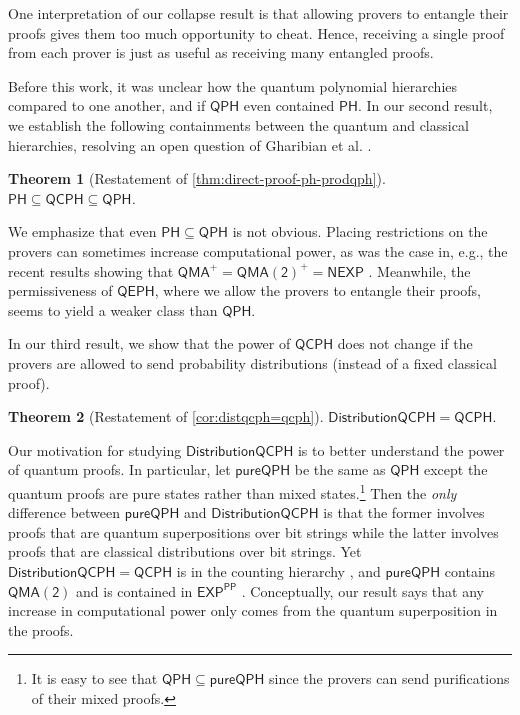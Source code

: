\documentclass[10pt,a4paper]{article}
\newtheorem{theorem}{Theorem}[section]
\theoremstyle{definition}
\newcommand{\class}[1]{\ensuremath{\mathsf{#1}}\xspace}
\newcommand{\EXP}{\class{EXP}}
\newcommand{\NEXP}{\class{NEXP}}
\newcommand{\QMA}{\class{QMA}}
\newcommand{\QMAk}[1][k]{\class{QMA(#1)}}
\newcommand{\QMAtwo}{\QMAk[2]}
\newcommand{\PP}{\class{PP}}
\newcommand{\PH}{\class{PH}}
\newcommand{\QCPH}{\class{QCPH}}
\newcommand{\QPH}{\class{QPH}}
\newcommand{\pureQPH}{\class{pureQPH}}
\newcommand{\QEPH}{\class{QEPH}}
\newcommand{\distributionQCPH}{\mathsf{DistributionQCPH}}
\begin{document}
One interpretation of our collapse result is that allowing provers to entangle their proofs gives them too much opportunity to cheat. Hence, receiving a single proof from each prover is just as useful as receiving many entangled proofs. 

Before this work, it was unclear how the quantum polynomial hierarchies compared to one another, and if $\QPH$ even contained $\PH$. 
In our second result, we establish the following containments between the quantum and classical hierarchies, resolving an open question of Gharibian et al. \cite{GSSSY22_qph}.

\begin{theorem}[Restatement of \cref{thm:direct-proof-ph-prodqph}]
    $\PH \subseteq \QCPH \subseteq \QPH$.
\end{theorem}

We emphasize that even $\PH \subseteq \QPH$ is not obvious.
Placing restrictions on the provers can sometimes increase computational power, as was the case in, e.g., the recent results showing that $\QMA^+ = \QMAtwo^+ = \NEXP$ \cite{jeronimo2023power, bassirian2023quantum}. 
Meanwhile, the permissiveness of $\QEPH$, where we allow the provers to entangle their proofs, seems to yield a weaker class than $\QPH$. 


In our third result, we show that the power of $\QCPH$ does not change if the provers are allowed to send probability distributions (instead of a fixed classical proof). 

\begin{theorem}[Restatement of \cref{cor:distqcph=qcph}]\label{thm:intro-distqcph=qcph}
   $\distributionQCPH = \QCPH.$
\end{theorem}

Our motivation for studying $\distributionQCPH$ is to better understand the power of quantum proofs. 
In particular, let $\pureQPH$ be the same as $\QPH$ except the quantum proofs are pure states rather than mixed states.\footnote{It is easy to see that $\QPH \subseteq \pureQPH$ since the provers can send purifications of their mixed proofs.\label{footnote:pureQPH}} 
Then the \emph{only} difference between $\pureQPH$ and $\distributionQCPH$ is that the former involves proofs that are quantum superpositions over bit strings while the latter involves proofs that are classical distributions over bit strings. 
Yet $\distributionQCPH = \QCPH$ is in the counting hierarchy \cite{GSSSY22_qph}, and $\pureQPH$ contains $\QMAtwo$ and is contained in $\EXP^\PP$ \cite{agarwal2023quantum}. Conceptually, our result says that any increase in computational power only comes from the quantum superposition in the proofs.
\end{document}
